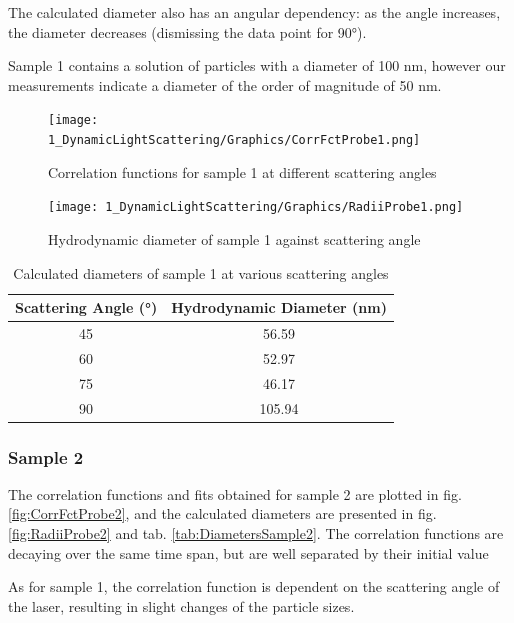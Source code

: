 \documentclass{article}
\begin{document}
The calculated diameter also has an angular dependency: as the angle increases, the diameter decreases (dismissing the data point for 90°). 

Sample 1 contains a solution of particles with a diameter of 100 nm, however our measurements indicate a diameter of the order of magnitude of 50 nm.

\begin{figure}[!ht]
    \centering
    \texttt{[image: 1\_DynamicLightScattering/Graphics/CorrFctProbe1.png]}
    \caption{Correlation functions for sample 1 at different scattering angles}
    \label{fig:CorrFctProbe1}
\end{figure}
\FloatBarrier

\begin{figure}[!ht]
    \centering
    \texttt{[image: 1\_DynamicLightScattering/Graphics/RadiiProbe1.png]}
    \caption{Hydrodynamic diameter of sample 1 against scattering angle}
    \label{fig:RadiiProbe1}
\end{figure}
\FloatBarrier

\begin{table}[!ht]
    \centering
    \begin{tabular}{|c|c|}
        \hline
        Scattering Angle (°) & Hydrodynamic Diameter (nm) \\ \hline \hline
        45 & 56.59 \\ \hline
        60 & 52.97 \\ \hline
        75 & 46.17 \\ \hline
        90 & 105.94 \\ \hline
    \end{tabular}
    \caption{Calculated diameters of sample 1 at various scattering angles}
    \label{tab:DiametersSample1}
\end{table}
\FloatBarrier

\subsubsection{Sample 2}

The correlation functions and fits obtained for sample 2 are plotted in fig. \ref{fig:CorrFctProbe2}, and the calculated diameters are presented in fig. \ref{fig:RadiiProbe2} and tab. \ref{tab:DiametersSample2}. The correlation functions are decaying over the same time span, but are well separated by their initial value

As for sample 1, the correlation function is dependent on the scattering angle of the laser, resulting in slight changes of the particle sizes. 
\end{document}
